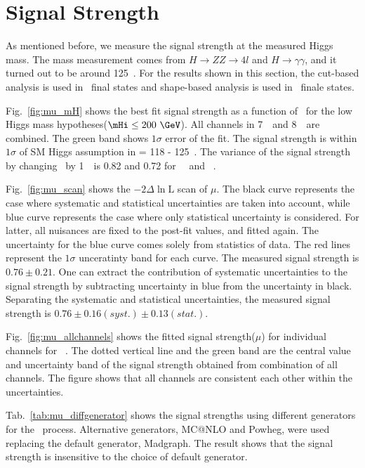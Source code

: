 \section{Signal Strength}

As mentioned before, we measure the signal strength at the 
measured Higgs mass. The mass measurement comes from 
$H\rightarrow ZZ\rightarrow4l$ and $H\rightarrow \gamma\gamma$, 
and it turned out to be around 125~\GeV. 
For the results shown in this section,   
the cut-based analysis is used in \SF\ final states 
and shape-based analysis is used in \DF\ finale states. 

Fig.~\ref{fig:mu_mH} shows the best fit signal strength 
as a function of \mHi\ for the low Higgs mass hypotheses($\mHi\le200~\GeV$).
All channels in 7~\TeV\ and 8~\TeV\ are combined. 
The green band shows $1\sigma$ error of the fit. 
The signal strength is within $1\sigma$ of SM Higgs assumption 
in \mHi = 118 - 125~\GeV. 
The variance of the signal strength by changing \mHi\ by 1~\GeV\
is 0.82 and 0.72 for ~\GeV\ and ~\GeV.  

Fig.~\ref{fig:mu_scan} shows the  $- 2\Delta\ln \textrm{L}$ scan of $\mu$. 
The black curve represents the case where systematic and statistical 
uncertainties are taken into account, while blue curve represents the case 
where only statistical uncertainty is considered. For latter,  
all nuisances are fixed to the post-fit values, and fitted again.  
The uncertainty for the blue curve comes solely from statistics of data. 
The red lines represent the $1\sigma$ unceratinty band for each curve. 
The measured signal strength is $0.76 \pm 0.21$.  
One can extract the contribution of systematic uncertainties to the signal strength
by subtracting uncertainty in blue from the uncertainty in black.
Separating the systematic and statistical uncertainties, 
the measured signal strength is $0.76 \pm 0.16(syst.) \pm 0.13(stat.)$.  

Fig.~\ref{fig:mu_allchannels} shows the fitted signal strength($\mu$) 
for individual channels for \mHi=125~\GeV.
The dotted vertical line and the green band are 
the central value and uncertainty band of the signal strength 
obtained from combination of all channels. 
The figure shows that all channels are consistent each other
within the uncertainties.

Tab.~\ref{tab:mu_diffgenerator} shows the signal strengths 
using different generators for the \qqww\ process. Alternative generators,
MC@NLO and Powheg, were used replacing the default generator, Madgraph.
The result shows that the signal strength is insensitive to the choice
of default generator. 


